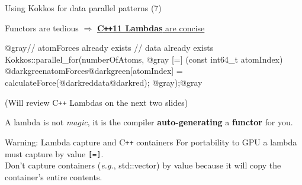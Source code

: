 \begin{frame}[fragile]{Using Kokkos for data parallel patterns (7)}

  Functors are tedious $\Rightarrow$ \ul{\textbf{C\texttt{++}11 Lambdas} are concise}

  \vspace{5pt}

  \begin{code}[linebackgroundcolor={
        \btLstHL<1->{4-6}{black!15}
      },
      keywords={}, frame=single]
@gray// atomForces already exists
// data already exists
Kokkos::parallel_for(numberOfAtoms, @gray
    [=] (const int64_t atomIndex) {
    @darkgreenatomForces@darkgreen[atomIndex] = calculateForce(@darkreddata@darkred);
  }
@gray);@gray
  \end{code}

  (Will review C\texttt{++} Lambdas on the next two slides)

  \pause

  A lambda is not \textit{magic}, it is the compiler \textbf{auto-generating} a \textbf{functor} for you.

  \pause
  \vspace{7pt}

  \begin{alertblock}{Warning: Lambda capture and C\texttt{++} containers}
    For portability to GPU a lambda must capture by value \texttt{[=]}. \\
    Don't capture containers (\textit{e.g.}, std::vector)
    by value because it will copy the container's entire contents.
  \end{alertblock}


\end{frame}


